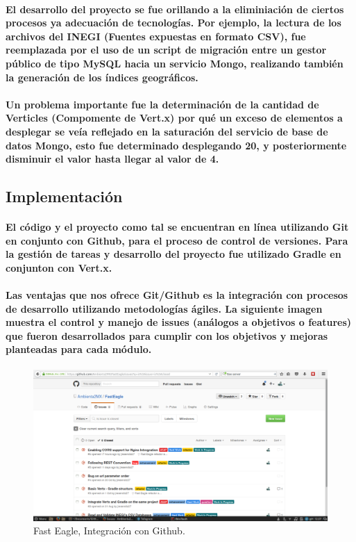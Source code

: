     \paragraph{El desarrollo del proyecto se fue orillando a la eliminiación de ciertos procesos ya adecuación de tecnologías. Por ejemplo, la lectura de los archivos del INEGI (Fuentes expuestas en formato CSV), fue reemplazada por el uso de un script de migración entre un gestor público de tipo MySQL hacia un servicio Mongo, realizando también la generación de los índices geográficos.}
    \paragraph{Un problema importante fue la determinación de la cantidad de Verticles (Compomente de Vert.x) por qué un exceso de elementos a desplegar se veía reflejado en la saturación del servicio de base de datos Mongo, esto fue determinado desplegando 20, y posteriormente disminuir el valor hasta llegar al valor de 4.}
  \subsection{Implementación}
    \paragraph{El código y el proyecto como tal se encuentran en línea utilizando Git\cite{38} en conjunto con Github\cite{39}, para el proceso de control de versiones. Para la gestión de tareas y desarrollo del proyecto fue utilizado Gradle en conjunton con Vert.x.}
    \paragraph{Las ventajas que nos ofrece Git/Github es la integración con procesos de desarrollo utilizando metodologías ágiles. La siguiente imagen muestra el control y manejo de issues (análogos a objetivos o features) que fueron desarrollados para cumplir con los objetivos y mejoras planteadas para cada módulo.}
    \begin{figure}[h!]
        \centering
          \includegraphics[width=\textwidth]{./images/FastEagleIssues.png}
          \caption{Fast Eagle, Integración con Github.}
    \end{figure}

